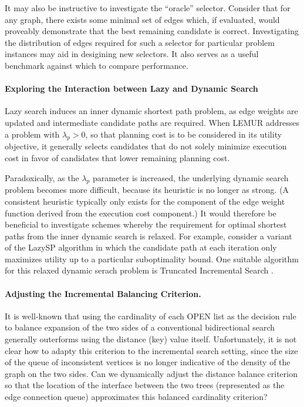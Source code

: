 It may also be instructive to investigate the ``oracle'' selector.
Consider that for any graph,
there exists some minimal set of edges which, if evaluated,
would proveably demonstrate that the best remaining candidate is
correct.
Investigating the distribution of edges required for such a selector
for particular problem instances
may aid in desigining new selectors.
It also serves as a useful benchmark against which to compare performance.

\paragraph{Exploring the Interaction between Lazy and Dynamic Search}
Lazy search induces an inner dynamic shortest path problem,
as edge weights are updated and intermediate candidate paths are
required.
When LEMUR addresses a problem with $\lambda_p > 0$,
so that planning cost is to be considered in its utility objective,
it generally selects candidates that do not solely minimize execution cost
in favor of candidates that lower remaining planning cost.

Paradoxically,
as the $\lambda_p$ parameter is increased,
the underlying dynamic search problem becomes more difficult,
because its heuristic is no longer as strong.
(A consistent heuristic typically only exists for the component of
the edge weight function derived from the execution cost component.)
It would therefore be beneficial to investigate schemes whereby
the requirement for optimal shortest paths from the inner
dynamic search is relaxed.
For example,
consider a variant of the LazySP algorithm
in which the candidate path at each iteration only maximizes utility
up to a particular suboptimality bound. 
One suitable algorithm for this relaxed dynamic serach problem
is Truncated Incremental Search \citep{aine2016truncatedincremental}.

\paragraph{Adjusting the Incremental Balancing Criterion.}
It is well-known \citep{pohl1969bidirectional}
that using the cardinality of each OPEN list as the decision rule
to balance expansion of the two sides of a conventional bidirectional
search generally outerforms using the distance (key) value itself.
Unfortunately,
it is not clear how to adapty this criterion to the incremental
search setting,
since the size of the queue of inconsistent vertices is no longer
indicative of the density of the graph on the two sides.
Can we dynamically adjust the distance balance criterion
so that the location of the interface between the two trees
(represented as the edge connection queue)
approximates this balanced cardinality criterion?

